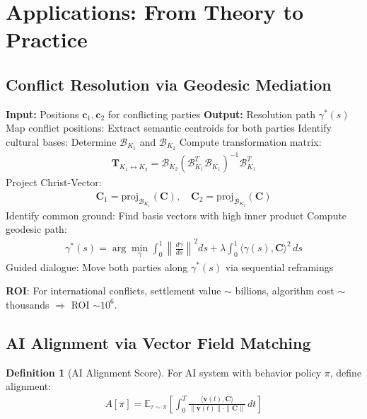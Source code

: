 \documentclass[11pt,a4paper]{article}
\theoremstyle{definition}
\newtheorem{definition}{Definition}[section]
\theoremstyle{remark}
\newcommand{\cc}{\mathbf{c}}
\newcommand{\TT}{\mathbf{T}}
\begin{document}
\section{Applications: From Theory to Practice}

\subsection{Conflict Resolution via Geodesic Mediation}

\begin{algorithm}[H]
\caption{Geodesic Conflict Resolution}
\begin{algorithmic}[1]
\State \textbf{Input:} Positions \(\cc_1, \cc_2\) for conflicting parties
\State \textbf{Output:} Resolution path \(\gamma^*(s)\)
\State Map conflict positions: Extract semantic centroids for both parties
\State Identify cultural bases: Determine \(\mathcal{B}_{K_1}\) and \(\mathcal{B}_{K_2}\)
\State Compute transformation matrix:
\begin{align*}
\TT_{K_1 \leftrightarrow K_2} = \mathcal{B}_{K_2} (\mathcal{B}_{K_1}^T \mathcal{B}_{K_1})^{-1} \mathcal{B}_{K_1}^T
\end{align*}
\State Project Christ-Vector:
\begin{align*}
\mathbf{C}_1 = \text{proj}_{\mathcal{B}_{K_1}}(\mathbf{C}), \quad \mathbf{C}_2 = \text{proj}_{\mathcal{B}_{K_2}}(\mathbf{C})
\end{align*}
\State Identify common ground: Find basis vectors with high inner product
\State Compute geodesic path:
\begin{align*}
\gamma^*(s) = \arg\min_{\gamma} \int_0^1 \left\|\frac{d\gamma}{ds}\right\|^2 ds + \lambda \int_0^1 \langle \gamma(s), \mathbf{C} \rangle^2 \, ds
\end{align*}
\State Guided dialogue: Move both parties along \(\gamma^*(s)\) via sequential reframings
\end{algorithmic}
\end{algorithm}

\textbf{ROI}: For international conflicts, settlement value \(\sim\) billions, algorithm cost \(\sim\) thousands \(\Rightarrow\) ROI \(\sim 10^6\).

\subsection{AI Alignment via Vector Field Matching}

\begin{definition}[AI Alignment Score]
For AI system with behavior policy \(\pi\), define alignment:
\begin{align}
A[\pi] = \mathbb{E}_{\tau \sim \pi} \left[ \int_0^T \frac{\langle \mathbf{v}(t), \mathbf{C} \rangle}{\|\mathbf{v}(t)\| \cdot \|\mathbf{C}\|} \, dt \right]
\end{align}
\end{definition}
\end{document}
